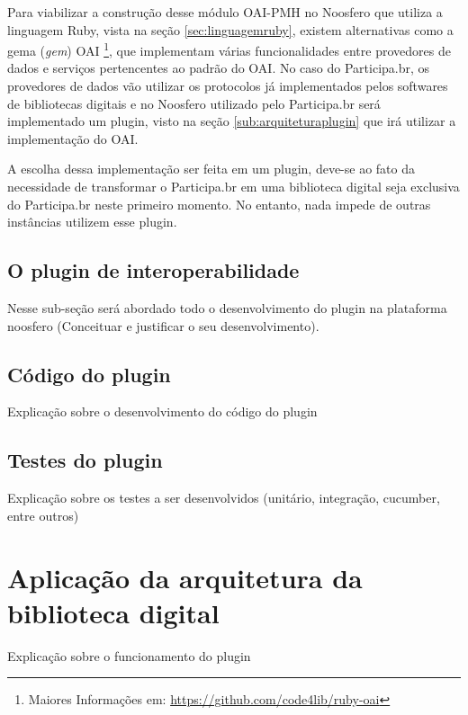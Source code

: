 Para viabilizar a construção desse módulo OAI-PMH no Noosfero que utiliza a linguagem Ruby, vista na seção \ref{sec:linguagemruby}, existem alternativas como a gema (\textit{gem}) OAI \footnote{Maiores Informações em: \url{https://github.com/code4lib/ruby-oai}}, que implementam várias funcionalidades entre provedores de dados e serviços pertencentes ao padrão do OAI. No caso do Participa.br, os provedores de dados vão utilizar os protocolos já implementados pelos softwares de bibliotecas digitais e no Noosfero utilizado pelo Participa.br será implementado um plugin, visto na seção \ref{sub:arquiteturaplugin} que irá utilizar a implementação do OAI.

A escolha dessa implementação ser feita em um plugin, deve-se ao fato da necessidade de transformar o Participa.br em uma biblioteca digital seja exclusiva do Participa.br neste primeiro momento. No entanto, nada impede de outras instâncias utilizem esse plugin.

%

\subsection{O plugin de interoperabilidade}

Nesse sub-seção será abordado todo o desenvolvimento do plugin na plataforma noosfero (Conceituar e justificar o seu desenvolvimento).

\subsection{Código do plugin}

Explicação sobre o desenvolvimento do código do plugin

\subsection{Testes do plugin}

Explicação sobre os testes a ser desenvolvidos (unitário, integração, cucumber, entre outros)

\section{Aplicação da arquitetura da biblioteca digital}

Explicação sobre o funcionamento do plugin

